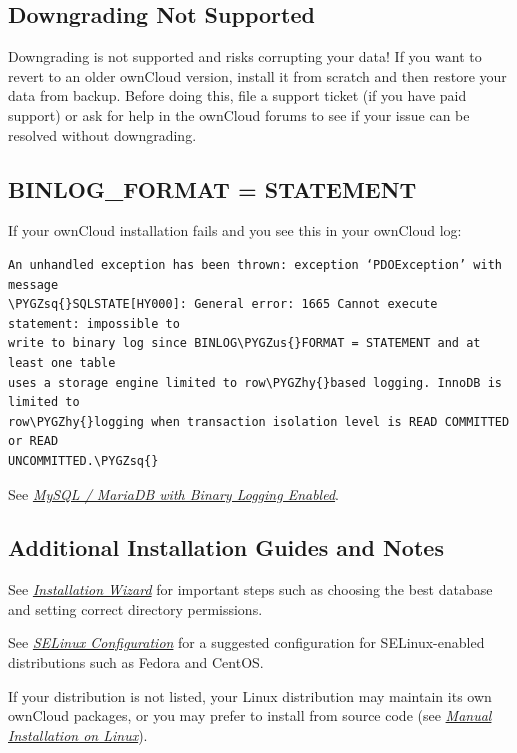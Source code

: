 \documentclass[letterpaper,10pt,english]{sphinxmanual}
\def\PYGZus{\char`\_}
\def\PYGZhy{\char`\-}
\def\PYGZsq{\char`\'}
\begin{document}
\subsection{Downgrading Not Supported}
\label{installation/linux_installation:downgrading-not-supported}
Downgrading is not supported and risks corrupting your data! If you want to
revert to an older ownCloud version, install it from scratch and then restore
your data from backup. Before doing this, file a support ticket (if you have
paid support) or ask for help in the ownCloud forums to see if your issue can be
resolved without downgrading.


\subsection{BINLOG\_FORMAT = STATEMENT}
\label{installation/linux_installation:binlog-format-statement}
If your ownCloud installation fails and you see this in your ownCloud log:

\begin{Verbatim}[commandchars=\\\{\}]
An unhandled exception has been thrown: exception ‘PDOException’ with message
\PYGZsq{}SQLSTATE[HY000]: General error: 1665 Cannot execute statement: impossible to
write to binary log since BINLOG\PYGZus{}FORMAT = STATEMENT and at least one table
uses a storage engine limited to row\PYGZhy{}based logging. InnoDB is limited to
row\PYGZhy{}logging when transaction isolation level is READ COMMITTED or READ
UNCOMMITTED.\PYGZsq{}
\end{Verbatim}

See {\hyperref[configuration_database/linux_database_configuration:db-binlog-label]{\emph{MySQL / MariaDB with Binary Logging Enabled}}}.


\subsection{Additional Installation Guides and Notes}
\label{installation/linux_installation:additional-installation-guides-and-notes}
See {\hyperref[installation/installation_wizard::doc]{\emph{Installation Wizard}}} for important steps such as choosing the best
database and setting correct directory permissions.

See {\hyperref[installation/selinux_configuration::doc]{\emph{SELinux Configuration}}} for a suggested configuration for
SELinux-enabled distributions such as Fedora and CentOS.

If your distribution is not listed, your Linux distribution may maintain its
own
ownCloud packages, or you may prefer to install from source code (see
{\hyperref[installation/source_installation::doc]{\emph{Manual Installation on Linux}}}).
\end{document}
